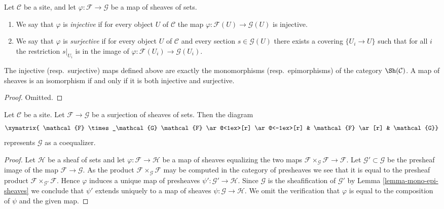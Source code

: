 \begin{definition}
\label{definition-sheaves-injective-surjective}
Let $\mathcal{C}$ be a site, and let $\varphi : \mathcal{F}
\to \mathcal{G}$ be a map of sheaves of sets.
\begin{enumerate}
\item We say that $\varphi$ is {\it injective} if for every object
$U$ of $\mathcal{C}$ the map $\varphi : \mathcal{F}(U)
\to \mathcal{G}(U)$ is injective.
\item We say that $\varphi$ is {\it surjective} if for every object
$U$ of $\mathcal{C}$ and every section $s\in \mathcal{G}(U)$
there exists a covering $\{U_i \to U\}$ such that for
all $i$ the restriction $s|_{U_i}$ is in the image of
$\varphi : \mathcal{F}(U_i) \to \mathcal{G}(U_i)$.
\end{enumerate}
\end{definition}

\begin{lemma}
\label{lemma-mono-epi-sheaves}
The injective (resp.\ surjective) maps defined above
are exactly the monomorphisms (resp.\ epimorphisms) of
the category $\Sh(\mathcal{C})$. A map of sheaves
is an isomorphism if and only if it is both injective
and surjective.
\end{lemma}

\begin{proof}
Omitted.
\end{proof}

\begin{lemma}
\label{lemma-coequalizer-surjection}
Let $\mathcal{C}$ be a site. Let $\mathcal{F} \to \mathcal{G}$
be a surjection of sheaves of sets. Then the diagram
$$
\xymatrix{
\mathcal{F} \times_\mathcal{G} \mathcal{F}
\ar@<1ex>[r] \ar@<-1ex>[r]
&
\mathcal{F} \ar[r]
&
\mathcal{G}}
$$
represents $\mathcal{G}$ as a coequalizer.
\end{lemma}

\begin{proof}
Let $\mathcal{H}$ be a sheaf of sets and let
$\varphi : \mathcal{F} \to \mathcal{H}$ be a map of sheaves equalizing
the two maps $\mathcal{F} \times_\mathcal{G} \mathcal{F} \to \mathcal{F}$.
Let $\mathcal{G}' \subset \mathcal{G}$ be the presheaf image of
the map $\mathcal{F} \to \mathcal{G}$. As the product
$\mathcal{F} \times_\mathcal{G} \mathcal{F}$ may be computed in the
category of presheaves we see that it is equal to the presheaf product
$\mathcal{F} \times_{\mathcal{G}'} \mathcal{F}$. Hence $\varphi$
induces a unique map of presheaves $\psi' : \mathcal{G}' \to \mathcal{H}$.
Since $\mathcal{G}$ is the sheafification of $\mathcal{G}'$ by
Lemma \ref{lemma-mono-epi-sheaves}
we conclude that $\psi'$ extends uniquely to a map of sheaves
$\psi : \mathcal{G} \to \mathcal{H}$. We omit the verification that
$\varphi$ is equal to the composition of $\psi$ and the given map.
\end{proof}














